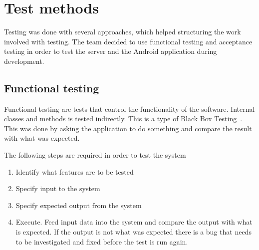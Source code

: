 \section{Test methods}
Testing was done with several approaches, which helped structuring the work involved with testing. The team decided to use functional testing and acceptance testing in order to test the server and the Android application during development.

\subsection{Functional testing}
\label{sec:funcTest}
Functional testing are tests that control the functionality of the software. Internal classes and methods is tested indirectly. This is a type of Black Box Testing~\cite{blackbox}.  This was done by asking the application to do something and compare the result with what was expected.

The following steps are required in order to test the system
\begin{enumerate}
\item Identify what features are to be tested
\item Specify input to the system
\item Specify expected output from the system
\item Execute. Feed input data into the system and compare the output with what is expected. If the output is not what was expected there is a bug that needs to be investigated and fixed before the test is run again.
\end{enumerate}

